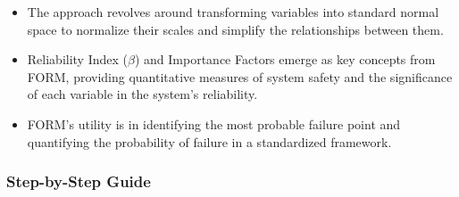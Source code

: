 \begin{itemize}
    \item The approach revolves around transforming variables into standard normal space to normalize their scales and simplify the relationships between them.
    \item Reliability Index (\( \beta \)) and Importance Factors emerge as key concepts from FORM, providing quantitative measures of system safety and the significance of each variable in the system's reliability.
    \item FORM's utility is in identifying the most probable failure point and quantifying the probability of failure in a standardized framework.
\end{itemize}

\subsubsection*{Step-by-Step Guide}

